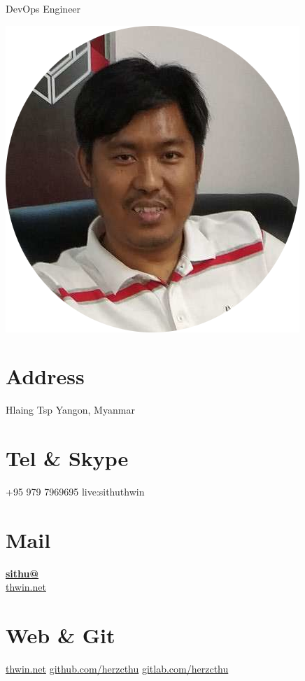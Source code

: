 \documentclass[]{friggeri-cv}
\begin{document}
      {DevOps Engineer}
      

\begin{aside}
  \includegraphics[scale=1]{img/myself-circle.png}
  \section{Address}
    Hlaing Tsp
    Yangon, Myanmar
    ~
  \section{Tel \& Skype}
    +95 979 7969695
    live:sithuthwin
    ~
  \section{Mail}
    \href{mailto:sithu@thwin.net}{\textbf{sithu@}\\thwin.net}
    ~
  \section{Web \& Git}
    \href{https://www.thwin.net}{thwin.net}
    \href{https://github.com/herzcthu}{github.com/herzcthu}
    \href{https://gitlab.com/herzcthu}{gitlab.com/herzcthu}
    ~

\end{aside}
\end{document}
